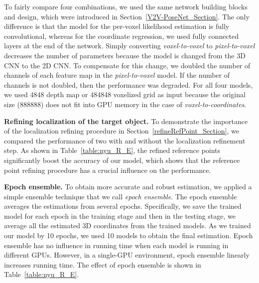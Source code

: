\documentclass[10pt,twocolumn,letterpaper]{article}
\begin{document}
To fairly compare four combinations, we used the same network building blocks and design, which were introduced in Section~\ref{V2V-PoseNet_Section}. The only difference is that the model for the per-voxel likelihood estimation is fully convolutional, whereas for the coordinate regression, we used fully connected layers at the end of the network. Simply converting \emph{voxel-to-voxel} to \emph{pixel-to-voxel} decreases the number of parameters because the model is changed from the 3D CNN to the 2D CNN. To compensate for this change, we doubled the number of channels of each feature map in the \emph{pixel-to-voxel} model. If the number of channels is not doubled, then the performance was degraded. For all four models, we used 4848 depth map or 484848 voxelized grid as input because the original size (888888) does not fit into GPU memory in the case of \emph{voxel-to-coordinates}.


{\bf Refining localization of the target object.}
To demonstrate the importance of the localization refining procedure in Section~\ref{refineRefPoint_Section}, we compared the performance of two with and without the localization refinement step. As shown in Table~\ref{table:nyu_R_E}, the refined reference points significantly boost the accuracy of our model, which shows that the reference point refining procedure has a crucial influence on the performance.


{\bf Epoch ensemble.}
To obtain more accurate and robust estimation, we applied a simple ensemble technique that we call \emph{epoch ensemble}. The epoch ensemble averages the estimations from several epochs. Specifically, we save the trained model for each epoch in the training stage and then in the testing stage, we average all the estimated 3D coordinates from the trained models. As we trained our model by 10 epochs, we used 10 models to obtain the final estimation. Epoch ensemble has no influence in running time when each model is running in different GPUs. However, in a single-GPU environment, epoch ensemble linearly increases running time. The effect of epoch ensemble is shown in Table~\ref{table:nyu_R_E}.
\end{document}
